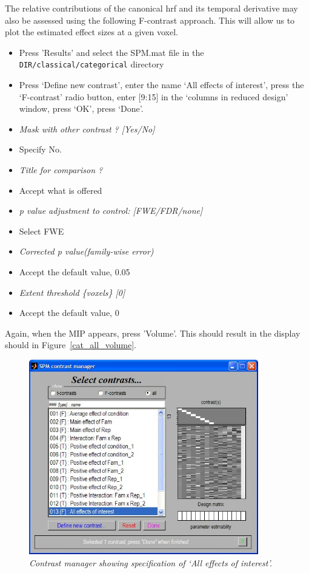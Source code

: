 \documentclass[a4paper,titlepage]{book}
\newcommand{\bi}{\begin{itemize}}
\newcommand{\ei}{\end{itemize}}
\begin{document}
The relative contributions of the canonical hrf and its temporal derivative may also be assessed using the following F-contrast approach. This will allow us to plot the estimated effect sizes at a given voxel.
\bi
\item{Press 'Results' and select the SPM.mat file in the 
\verb!DIR/classical/categorical! directory}
\item{Press `Define new contrast', enter the name `All effects of interest', press the `F-contrast' radio button, enter [9:15] in the `columns in reduced design' window, press `OK', press `Done'.}
\item{\em Mask with other contrast ? [Yes/No]}
\item{Specify No.}
\item{\em Title for comparison ?}
\item{Accept what is offered}
\item{\em p value adjustment to control: [FWE/FDR/none]}
\item{Select FWE}
\item{\em Corrected p value(family-wise error)}
\item{Accept the default value, 0.05}
\item{\em Extent threshold \{voxels\} [0]}
\item{Accept the default value, 0}
\ei
Again, when the MIP appears, press 'Volume'. This should result in the display should in Figure~\ref{cat_all_volume}.
\begin{figure}
\begin{center}
\includegraphics[width=100mm]{cat_all_contrast}
\caption{\em Contrast manager showing specification of `All effects of interest'. \label{cat_all_contrast} }
\end{center}
\end{figure}
\end{document}
